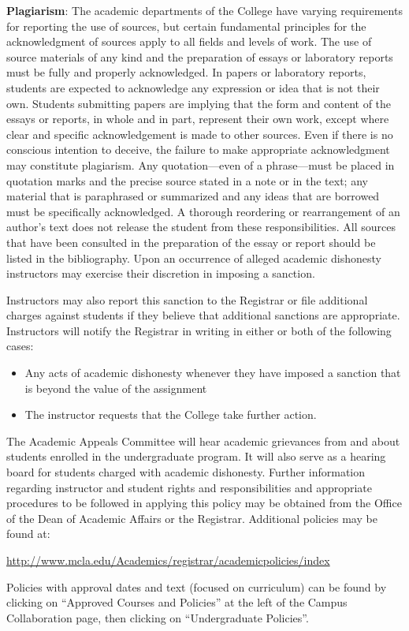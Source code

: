 \documentclass[letterpaper,10pt]{article}
\providecommand{\hd}[1]{\noindent\textbf{#1}}
\begin{document}
\hd{Plagiarism}: The academic departments of the College have varying requirements for reporting the use of sources, but certain fundamental principles for the acknowledgment of sources apply to all fields and levels of work. The use of source materials of any kind and the preparation of essays or laboratory reports must be fully and properly acknowledged. In papers or laboratory reports, students are expected to acknowledge any expression or idea that is not their own. Students submitting papers are implying that the form and content of the essays or reports, in whole and in part, represent their own work, except where clear and specific acknowledgement is made to other sources. Even if there is no conscious intention to deceive, the failure to make appropriate acknowledgment may constitute plagiarism. Any quotation---even of a phrase---must be placed in quotation marks and the precise source stated in a note or in the text; any material that is paraphrased or summarized and any ideas that are borrowed must be specifically acknowledged. A thorough reordering or rearrangement of an author's text does not release the student from these responsibilities. All sources that have been consulted in the preparation of the essay or report should be listed in the bibliography. Upon an occurrence of alleged academic dishonesty instructors may exercise their discretion in imposing a sanction.

Instructors may also report this sanction to the Registrar or file additional charges against students if they believe that additional sanctions are appropriate. Instructors will notify the Registrar in writing in either or both of the following cases:
\begin{itemize}
\item Any acts of academic dishonesty whenever they have imposed a sanction that is beyond the value of the assignment
\item The instructor requests that the College take further action.
\end{itemize}
The Academic Appeals Committee will hear academic grievances from and about students enrolled
in the undergraduate program. It will also serve as a hearing board for students charged with
academic dishonesty. Further information regarding instructor and student rights and responsibilities and appropriate procedures to be followed in applying this policy may be obtained from the Office of the Dean of Academic Affairs or the Registrar. Additional policies may be found at:

\url{http://www.mcla.edu/Academics/registrar/academicpolicies/index}

Policies with approval dates and text (focused on curriculum) can be found by clicking on
``Approved Courses and Policies'' at the left of the Campus Collaboration page, then clicking on ``Undergraduate Policies''.
\end{document}
